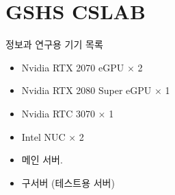 \chapter{GSHS CSLAB}
정보과 연구용 기기 목록
\begin{itemize}
    \item Nvidia RTX 2070 eGPU $\times$ 2
    \item Nvidia RTX 2080 Super eGPU $\times$ 1
    \item Nvidia RTC 3070 $\times$ 1 
    \item Intel NUC $\times$ 2
    \item 메인 서버.
    \item 구서버 (테스트용 서버)
\end{itemize}
